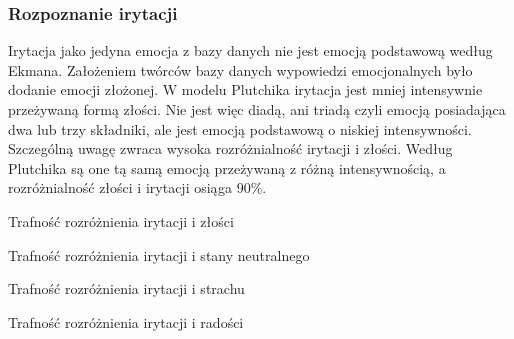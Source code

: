 \documentclass[a4paper,12pt,twoside,openany]{report}
\begin{document}
\subsubsection{Rozpoznanie irytacji}
Irytacja jako jedyna emocja z bazy danych nie jest emocją podstawową według Ekmana.
Założeniem twórców bazy danych wypowiedzi emocjonalnych było dodanie emocji złożonej.
W modelu Plutchika irytacja jest mniej intensywnie przeżywaną formą złości.
Nie jest więc diadą, ani triadą czyli emocją posiadająca dwa lub trzy składniki,
ale jest emocją podstawową o niskiej intensywności.
Szczególną uwagę zwraca wysoka rozróżnialność irytacji i złości.
Według Plutchika są one tą samą emocją przeżywaną z różną intensywnością,
a rozróżnialność złości i irytacji osiąga 90\%.
\begin{table}[hc!]
	\caption{Trafność rozróżnienia irytacji i złości}
	\centering
	
	\label{tab:irytacja:zlosc}
\end{table}
\begin{table}[hc!]
	\caption{Trafność rozróżnienia irytacji i stany neutralnego}
	\centering
	
	\label{tab:irytacja:neutralny}
\end{table}
\begin{table}[hc!]
	\caption{Trafność rozróżnienia irytacji i strachu}
	\centering
	
	\label{tab:irytacja:strach}
\end{table}
\begin{table}[hc!]
	\caption{Trafność rozróżnienia irytacji i radości}
	\centering
	
	\label{tab:irytacja:zlosc}
\end{table}
%	
%	
\end{document}
